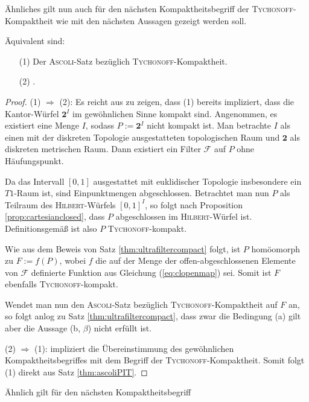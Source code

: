 Ähnliches gilt nun auch für den nächsten Kompaktheitsbegriff der \textsc{Tychonoff}-Kompaktheit wie mit den nächsten Aussagen gezeigt werden soll.

\begin{thm}
  Äquivalent sind:
  \begin{enumerate}
    \item[(1)] Der \textsc{Ascoli}-Satz bezüglich \textsc{\textsc{Tychonoff}}-Kompaktheit.
    \item[(2)] \PIT.
  \end{enumerate}
\end{thm}

\begin{proof}
  (1) $\Rightarrow$ (2): Es reicht aus zu zeigen, dass (1) bereits impliziert, dass die Kantor-Würfel $\mathbf{2}^I$ im gewöhnlichen Sinne kompakt sind.
  Angenommen, es existiert eine Menge $I$, sodass $P:= \mathbf{2}^I$ nicht kompakt ist.
  Man betrachte $I$ als einen mit der diskreten Topologie ausgestatteten topologischen Raum und $\mathbf{2}$ als diskreten metrischen Raum.
  Dann existiert ein Filter $\mathcal{F}$ auf $P$ ohne Häufungspunkt.

  Da das Intervall $[0,1]$ ausgestattet mit euklidischer Topologie insbesondere ein $T1$-Raum ist, sind Einpunktmengen abgeschlossen.
  Betrachtet man nun $P$ als Teilraum des \textsc{Hilbert}-Würfels $[0,1]^I$, so folgt nach Proposition \ref{prop:cartesianclosed}, dass $P$ abgeschlossen im \textsc{Hilbert}-Würfel ist.
  Definitionsgemäß ist also $P$ \textsc{Tychonoff}-kompakt.

  Wie aus dem Beweis von Satz \ref{thm:ultrafiltercompact} folgt, ist $P$ homöomorph zu $F:= f(P)$, wobei $f$ die auf der Menge der offen-abgeschlossenen Elemente von $\mathcal{F}$ definierte Funktion aus Gleichung (\ref{eq:clopenmap}) sei.
  Somit ist $F$ ebenfalls \textsc{Tychonoff}-kompakt.

  Wendet man nun den \textsc{Ascoli}-Satz bezüglich \textsc{Tychonoff}-Kompaktheit auf $F$ an, so folgt anlog zu Satz \ref{thm:ultrafiltercompact}, dass zwar die Bedingung (a) gilt aber die Aussage (b, $\beta$) nicht erfüllt ist.

  (2) $\Rightarrow$ (1): \PIT impliziert die Übereinstimmung des gewöhnlichen Kompaktheitsbegriffes mit dem Begriff der \textsc{Tychonoff}-Kompaktheit. Somit folgt (1) direkt aus Satz \ref{thm:ascoliPIT}.
\end{proof}

Ähnlich gilt für den nächsten Kompaktheitsbegriff

